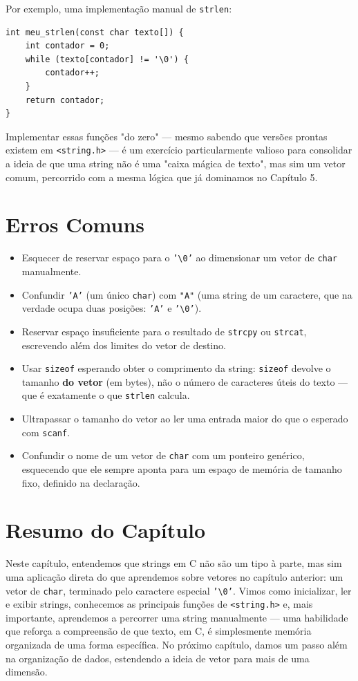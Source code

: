 \documentclass[12pt,a4paper,oneside]{extreport}
\begin{document}
Por exemplo, uma implementação manual de \texttt{strlen}:

\begin{lstlisting}
int meu_strlen(const char texto[]) {
    int contador = 0;
    while (texto[contador] != '\0') {
        contador++;
    }
    return contador;
}
\end{lstlisting}

Implementar essas funções "do zero" — mesmo sabendo que versões prontas existem em \texttt{<string.h>} — é um exercício particularmente valioso para consolidar a ideia de que uma string não é uma "caixa mágica de texto", mas sim um vetor comum, percorrido com a mesma lógica que já dominamos no Capítulo 5.

\section{Erros Comuns}

\begin{itemize}
    \item Esquecer de reservar espaço para o \texttt{'\textbackslash 0'} ao dimensionar um vetor de \texttt{char} manualmente.
    \item Confundir \texttt{'A'} (um único \texttt{char}) com \texttt{"A"} (uma string de um caractere, que na verdade ocupa duas posições: \texttt{'A'} e \texttt{'\textbackslash 0'}).
    \item Reservar espaço insuficiente para o resultado de \texttt{strcpy} ou \texttt{strcat}, escrevendo além dos limites do vetor de destino.
    \item Usar \texttt{sizeof} esperando obter o comprimento da string: \texttt{sizeof} devolve o tamanho \textbf{do vetor} (em bytes), não o número de caracteres úteis do texto — que é exatamente o que \texttt{strlen} calcula.
    \item Ultrapassar o tamanho do vetor ao ler uma entrada maior do que o esperado com \texttt{scanf}.
    \item Confundir o nome de um vetor de \texttt{char} com um ponteiro genérico, esquecendo que ele sempre aponta para um espaço de memória de tamanho fixo, definido na declaração.
\end{itemize}

\section*{Resumo do Capítulo}
Neste capítulo, entendemos que strings em C não são um tipo à parte, mas sim uma aplicação direta do que aprendemos sobre vetores no capítulo anterior: um vetor de \texttt{char}, terminado pelo caractere especial \texttt{'\textbackslash 0'}. Vimos como inicializar, ler e exibir strings, conhecemos as principais funções de \texttt{<string.h>} e, mais importante, aprendemos a percorrer uma string manualmente — uma habilidade que reforça a compreensão de que texto, em C, é simplesmente memória organizada de uma forma específica. No próximo capítulo, damos um passo além na organização de dados, estendendo a ideia de vetor para mais de uma dimensão.
\end{document}
